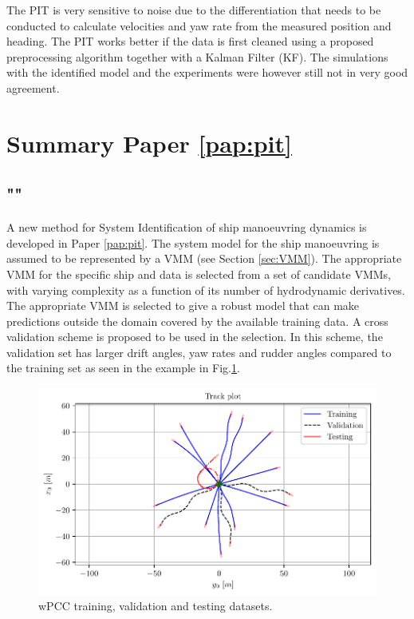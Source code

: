 \noindent The PIT is very sensitive to noise due to the differentiation that needs to be conducted to calculate velocities and yaw rate from the measured position and heading. The PIT works better if the data is first cleaned using a proposed preprocessing algorithm together with a Kalman Filter (KF). The simulations with the identified model and the experiments were however still not in very good agreement.     

\section{Summary Paper \ref{pap:pit}}
\subsection*{""}
A new method for System Identification of ship manoeuvring dynamics is developed in Paper \ref{pap:pit}. The system model for the ship manoeuvring is assumed to be represented by a VMM (see Section \ref{sec:VMM}). The appropriate VMM for the specific ship and data is selected from a set of candidate VMMs, with varying complexity as a function of its number of hydrodynamic derivatives. The appropriate VMM is selected to give a robust model that can make predictions outside the domain covered by the available training data. A cross validation scheme is proposed to be used in the selection. In this scheme, the validation set has larger drift angles, yaw rates and rudder angles compared to the training set as seen in the example in Fig.\ref{fig:cross_validation}.
\begin{figure}[H]
    \centering
    \includegraphics[width=\linewidth]{kappa/images/3.pdf}
    \caption{wPCC training, validation and testing datasets.}
    \label{fig:cross_validation}
\end{figure}
